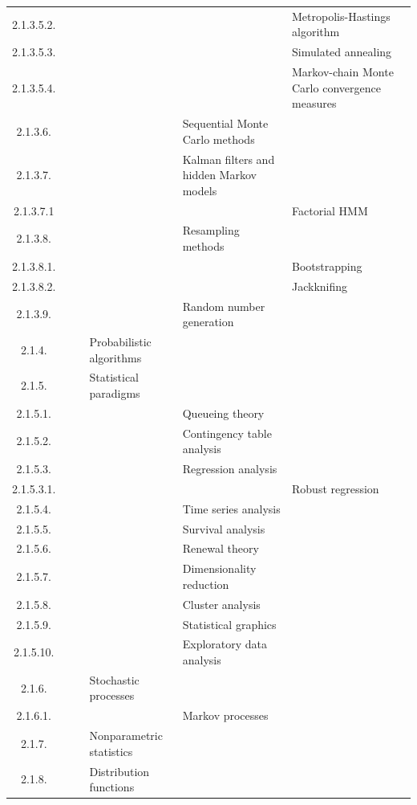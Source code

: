 \documentclass[12pt]{article}
\begin{document}
\begin{center}
{\begin{tabularx}{\linewidth}{|c|X|X|X|X|X|X|}
		2.1.3.5.2. &   &   &   &   &  Metropolis-Hastings algorithm &   \\
		2.1.3.5.3. &   &   &   &   &  Simulated annealing &   \\
		2.1.3.5.4. &   &   &   &   &  Markov-chain Monte Carlo convergence measures &   \\
		2.1.3.6. &   &   &   &  Sequential Monte Carlo methods &   &   \\
		2.1.3.7. &   &   &   &  Kalman filters and hidden Markov models &   &   \\
		2.1.3.7.1 &   &   &   &   &  Factorial HMM &   \\
		2.1.3.8. &   &   &   &  Resampling methods &   &   \\
		2.1.3.8.1. &   &   &   &   &  Bootstrapping &   \\
		2.1.3.8.2. &   &   &   &   &  Jackknifing &   \\
		2.1.3.9. &   &   &   &  Random number generation &   &   \\
		2.1.4. &   &   &  Probabilistic algorithms &   &   &   \\
		2.1.5. &   &   &  Statistical paradigms &   &   &   \\
		2.1.5.1. &   &   &   &  Queueing theory &   &   \\
		2.1.5.2. &   &   &   &  Contingency table analysis &   &   \\
		2.1.5.3. &   &   &   &  Regression analysis &   &   \\
		2.1.5.3.1. &   &   &   &   &  Robust regression &   \\
		2.1.5.4. &   &   &   &  Time series analysis &   &   \\
		2.1.5.5. &   &   &   &  Survival analysis &   &   \\
		2.1.5.6. &   &   &   &  Renewal theory &   &   \\
		2.1.5.7. &   &   &   &  Dimensionality reduction &   &   \\
		2.1.5.8. &   &   &   &  Cluster analysis &   &   \\
		2.1.5.9. &   &   &   &  Statistical graphics &   &   \\
		2.1.5.10. &   &   &   &  Exploratory data analysis &   &   \\
		2.1.6. &   &   &  Stochastic processes &   &   &   \\
		2.1.6.1. &   &   &   &  Markov processes &   &   \\
		2.1.7. &   &   &  Nonparametric statistics &   &   &   \\
		2.1.8. &   &   &  Distribution functions &   &   &   \\

\end{tabularx}}
\end{center}
\end{document}
